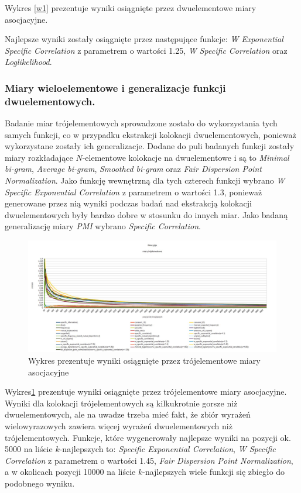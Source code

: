 \documentclass[11pt,a4paper]{llncs}
\begin{document}
Wykres \ref{w1} prezentuje wyniki osiągnięte przez dwuelementowe miary asocjacyjne.

Najlepsze wyniki zostały osiągnięte przez następujące funkcje: \emph{W Exponential Specific Correlation} z parametrem o wartości 1.25, \emph{W Specific Correlation} oraz \emph{Loglikelihood}.


\subsubsection{Miary wieloelementowe i generalizacje funkcji dwuelementowych.}

Badanie miar trójelementowych sprowadzone zostało do wykorzystania tych samych funkcji, co w przypadku ekstrakcji kolokacji dwuelementowych, ponieważ wykorzystane zostały ich generalizacje.
Dodane do puli badanych funkcji zostały miary rozkładające $N$-elementowe kolokacje na dwuelementowe i są to \emph{Minimal bi-gram}, \emph{Average bi-gram}, \emph{Smoothed bi-gram} oraz \emph{Fair Dispersion Point Normalization}.
Jako funkcję wewnętrzną dla tych czterech funkcji wybrano \emph{W Specific Exponential Correlation} z parametrem o wartości 1.3, ponieważ generowane przez nią wyniki podczas badań nad ekstrakcją kolokacji dwuelementowych były bardzo dobre w stosunku do innych miar.
Jako badaną generalizację miary \emph{PMI} wybrano \emph{Specific Correlation}.

\begin{figure}[h!]
\centering
\includegraphics[width=\textwidth]{charts/wyniki_3.jpg}
\caption [Wyniki miar trójelementowych]{Wykres prezentuje wyniki osiągnięte przez trójelementowe miary asocjacyjne}
\label{w3}
\end{figure}

Wykres\ref{w3} prezentuje wyniki osiągnięte przez trójelementowe miary asocjacyjne.
Wyniki dla kolokacji trójelementowych są kilkukrotnie gorsze niż dwuelementowych, ale na uwadze trzeba mieć fakt, że zbiór wyrażeń wielowyrazowych zawiera więcej wyrażeń dwuelementowych niż trójelementowych.
Funkcje, które wygenerowały najlepsze wyniki na pozycji ok. 5000 na liście $k$-najlepszych to: \emph{Specific Exponential Correlation}, \emph{W Specific Correlation} z parametrem o wartości 1.45, \emph{Fair Dispersion Point Normalization}, a w okolicach pozycji 10000 na liście $k$-najlepszych wiele funkcji się zbiegło do podobnego wyniku.
\end{document}
